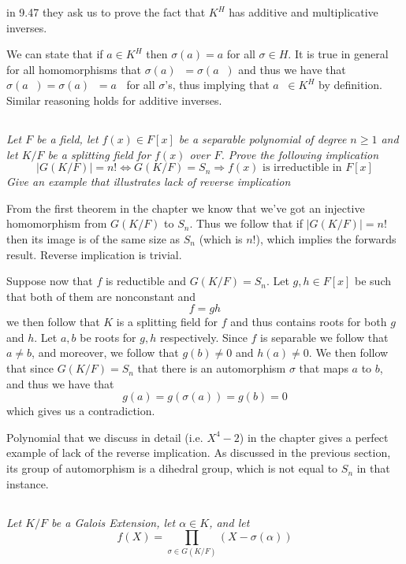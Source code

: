 \documentclass[11pt,oneside,titlepage]{book}
\DeclareMathOperator \inv {^{-1}}
\DeclareMathOperator \lra {\Leftrightarrow}
\DeclareMathOperator \ra {\Rightarrow}
\begin{document}
in 9.47 they ask us to prove the fact that $K^H$ has additive and
multiplicative inverses.

We can state that if $a \in K^H$ then $\sigma(a) = a$ for all $\sigma
\in H$. It is true in general for all homomorphisms that
$\sigma(a)\inv = \sigma(a\inv)$ and thus we have that $\sigma(a\inv) =
\sigma(a)\inv = a\inv$ for all $\sigma$'s, thus implying that $a\inv
\in K^H$ by definition. Similar reasoning holds for additive inverses.

\subsection{}

\textit{Let $F$ be a field, let $f(x) \in F[x]$ be a separable
  polynomial of degree $n \geq 1$ and let $K/F$ be a splitting field for
  $f(x)$ over $F$. Prove the following implication
  $$|G(K/F)| = n! \lra G(K/F) = S_n \ra f(x) \text{ is irreductible in } F[x]$$
  Give an example that illustrates lack of reverse implication
}

From the first theorem in the chapter we know that we've got an
injective homomorphism from $G(K/F)$ to $S_n$. Thus we follow that if
$|G(K/F)| = n!$ then its image is of the same size as $S_n$ (which is
$n!$), which implies the forwards result. Reverse implication is
trivial.

Suppose now that $f$ is reductible and $G(K/F) = S_n$. Let $g, h \in
F[x]$ be such that both of them are nonconstant and
$$f = gh$$
we then follow that $K$ is a splitting field for $f$ and thus contains
roots for both $g$ and $h$. Let $a, b$ be roots for $g, h$
respectively. Since $f$ is separable we follow that $a \neq b$, and
moreover, we follow that $g(b) \neq 0$ and $h(a) \neq 0$. We then follow that
since $G(K/F) = S_n$ that there is an automorphism $\sigma$ that maps
$a$ to $b$, and thus we have that
$$g(a) = g(\sigma(a)) = g(b) = 0$$
which gives us a contradiction.

Polynomial that we discuss in detail (i.e. $X^4 - 2$) in the chapter
gives a perfect example of lack of the reverse implication. As discussed
in the previous section, its group of automorphism is a dihedral group,
which is not equal to $S_n$ in that instance.

\subsection{}

\textit{Let $K/F$ be a Galois Extension, let $\alpha \in K$, and let
  $$f(X) = \prod_{\sigma \in G(K/F)}{(X - \sigma(\alpha))}$$
}
\end{document}
